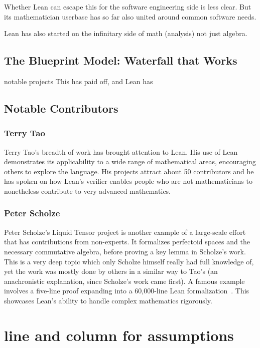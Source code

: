 \documentclass{article}
\begin{document}
Whether Lean can escape this for the software engineering side is less clear. But its mathematician userbase has so far also united around common software needs.

Lean has also started on the infinitary side of math (analysis) not just algebra.
\subsection{The Blueprint Model: Waterfall that Works}
notable projects
This has paid off, and Lean has

\subsection{Notable Contributors}
\subsubsection{Terry Tao}
Terry Tao's breadth of work has brought attention to Lean. His use of Lean demonstrates its applicability to a wide range of mathematical areas, encouraging others to explore the language. His projects attract about 50 contributors and he has spoken on how Lean's verifier enables people who are not mathematicians to nonetheless contribute to very advanced mathematics.

\subsubsection{Peter Scholze}
Peter Scholze's Liquid Tensor project is another example of a large-scale effort that has contributions from non-experts. It formalizes perfectoid spaces and the necessary commutative algebra, before proving a key lemma in Scholze's work. This is a very deep topic which only Scholze himself really had full knowledge of, yet the work was mostly done by others in a similar way to Tao's (an anachronistic explanation, since Scholze's work came first). A famous example involves a five-line proof expanding into a 60,000-line Lean formalization~\cite{liquid-tensor}. This showcases Lean's ability to handle complex mathematics rigorously.

\section{line and column for assumptions}
\end{document}
